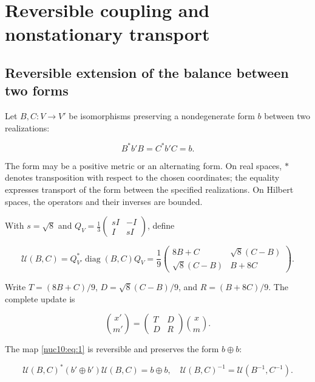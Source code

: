 \section{Reversible coupling and nonstationary transport}
\label{nuclear:10}
\subsection{Reversible extension of the balance between two forms}

Let \(B,C:V\to V'\) be isomorphisms preserving a nondegenerate form \(b\) between two realizations:

\[
B^*b'B=C^*b'C=b.
\]

The form may be a positive metric or an alternating form. On real spaces, \(*\) denotes transposition with respect to the chosen coordinates; the equality expresses transport of the form between the specified realizations. On Hilbert spaces, the operators and their inverses are bounded.

With \(s=\sqrt8\) and \(Q_V=\frac13\left(\begin{smallmatrix}sI&-I\\I&sI\end{smallmatrix}\right)\), define

\begin{equation}
\boxed{
\mathcal U(B,C)=Q_{V'}^*\operatorname{diag}(B,C)Q_V
=\frac19\begin{pmatrix}8B+C&\sqrt8(C-B)\\\sqrt8(C-B)&B+8C\end{pmatrix}.}
\label{nuc10:eq:1}
\end{equation}

Write \(T=(8B+C)/9\), \(D=\sqrt8(C-B)/9\), and \(R=(B+8C)/9\). The complete update is

\begin{equation}
\binom{x'}{m'}=\begin{pmatrix}T&D\\D&R\end{pmatrix}\binom{x}{m}.
\label{nuc10:eq:2}
\end{equation}

\begin{theorem}
The map \eqref{nuc10:eq:1} is reversible and preserves the form \(b\oplus b\):

\begin{equation}
\mathcal U(B,C)^*(b'\oplus b')\mathcal U(B,C)=b\oplus b,
\quad\mathcal U(B,C)^{-1}=\mathcal U(B^{-1},C^{-1}).
\label{nuc10:eq:3}
\end{equation}
\end{theorem}

